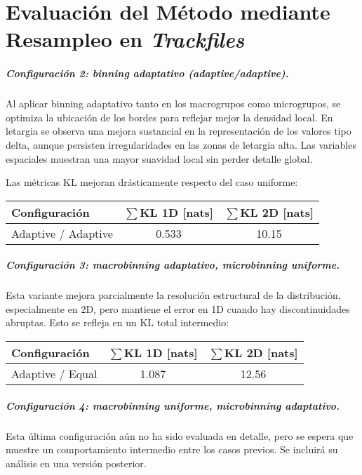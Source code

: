 \chapter{Evaluación del Método mediante Resampleo en \emph{Trackfiles}}
\label{chap:evaluacion-trackfiles}

\paragraph{Configuración 2: binning adaptativo (adaptive/adaptive).}  
Al aplicar binning adaptativo tanto en los macrogrupos como microgrupos, se optimiza la ubicación de los bordes para reflejar mejor la densidad local. En letargia se observa una mejora sustancial en la representación de los valores tipo delta, aunque persisten irregularidades en las zonas de letargia alta. Las variables espaciales muestran una mayor suavidad local sin perder detalle global.

Las métricas KL mejoran drásticamente respecto del caso uniforme:

\begin{center}
\begin{tabular}{lcc}
\toprule
\textbf{Configuración} & $\sum$KL 1D [nats] & $\sum$KL 2D [nats] \\
\midrule
Adaptive / Adaptive & 0.533 & 10.15 \\
\bottomrule
\end{tabular}
\end{center}

\paragraph{Configuración 3: macrobinning adaptativo, microbinning uniforme.}  
Esta variante mejora parcialmente la resolución estructural de la distribución, especialmente en 2D, pero mantiene el error en 1D cuando hay discontinuidades abruptas. Esto se refleja en un KL total intermedio:

\begin{center}
\begin{tabular}{lcc}
\toprule
\textbf{Configuración} & $\sum$KL 1D [nats] & $\sum$KL 2D [nats] \\
\midrule
Adaptive / Equal & 1.087 & 12.56 \\
\bottomrule
\end{tabular}
\end{center}

\paragraph{Configuración 4: macrobinning uniforme, microbinning adaptativo.}  
Esta última configuración aún no ha sido evaluada en detalle, pero se espera que muestre un comportamiento intermedio entre los casos previos. Se incluirá su análisis en una versión posterior.



